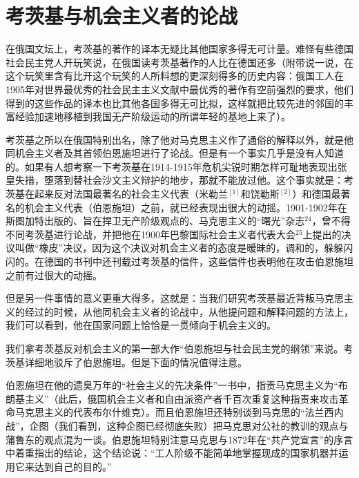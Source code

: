 \chapter{考茨基与机会主义者的论战} %

在俄国文坛上，考茨基的著作的译本无疑比其他国家多得无可计量。难怪有些德国社会民主党人开玩笑说，在俄国读考茨基著作的人比在德国还多（附带说一说，在这个玩笑里含有比开这个玩笑的人所料想的更深刻得多的历史内容：俄国工人在1905年对世界最优秀的社会民主主义文献中最优秀的著作有空前强烈的要求，他们得到的这些作品的译本也比其他各国多得无可比拟，这样就把比较先进的邻国的丰富经验加速地移植到我国无产阶级运动的所谓年轻的基地上来了）。

考茨基之所以在俄国特别出名，除了他对马克思主义作了通俗的解释以外，就是他同机会主义者及其首领伯恩施坦进行了论战。但是有一个事实几乎是没有人知道的。如果有人想考察一下考茨基在1914-1915年危机尖锐时期怎样可耻地表现出张皇失措，堕落到替社会沙文主义辩护的地步，那就不能放过他。这个事实就是：考茨基在起来反对法国最著名的社会主义代表（米勒兰$^{[1]}$和饶勒斯$^{[2]}$）和德国最著名的机会主义代表（伯恩施坦）之前，就已经表现出很大的动摇。1901-1902年在斯图加特出版的、旨在捍卫无产阶级观点的、马克思主义的“曙光”杂志$^{24}$，曾不得不同考茨基进行{\kaishu 论战}，并把他在1900年巴黎国际社会主义者代表大会$^{25}$上提出的决议叫做“橡皮”决议，因为这个决议对机会主义者的态度是暧昧的，调和的，躲躲闪闪的。在德国的书刊中还刊载过考茨基的信件，这些信件也表明他在攻击伯恩施坦之前有过很大的动摇。

但是另一件事情的意义更重大得多，这就是：当我们研究考茨基最近背叛马克思主义的{\kaishu 经过}的时候，从他同机会主义者的论战中，从他提问题和解释问题的方法上，我们可以看到，他在国家问题上恰恰是一贯倾向于机会主义的。

我们拿考茨基反对机会主义的第一部大作“伯恩施坦与社会民主党的纲领”来说。考茨基详细地驳斥了伯恩施坦。但是下面的情况值得注意。

伯恩施坦在他的遗臭万年的“社会主义的先决条件”一书中，指责马克思主义为“{\kaishu 布朗基主义}”（此后，俄国机会主义者和自由派资产者千百次重复这种指责来攻击革命马克思主义的代表布尔什维克）。而且伯恩施坦还特别谈到马克思的“法兰西内战”，企图（我们看到，这种企图已经彻底失败）把马克思对公社的教训的观点与蒲鲁东的观点混为一谈。伯恩施坦特别注意马克思与1872年在“共产党宣言”的序言中着重指出的结论，这个结论说：“工人阶级不能简单地掌握现成的国家机器并运用它来达到自己的目的。”

